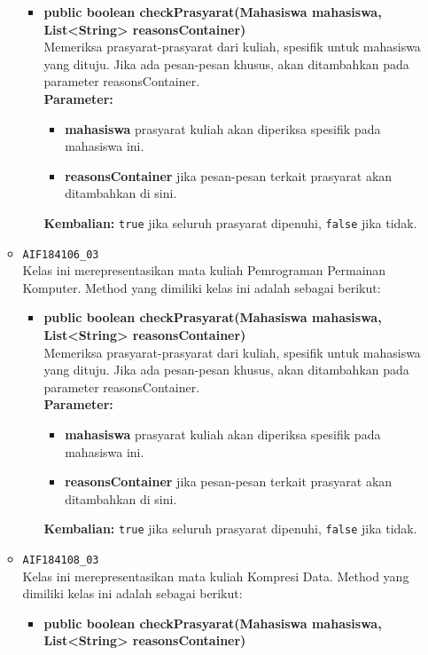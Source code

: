 \begin{enumerate}
\begin{itemize}
		\begin{itemize}
			\item \textbf{public boolean checkPrasyarat(Mahasiswa mahasiswa, List<String> reasonsContainer)}\\
			Memeriksa prasyarat-prasyarat dari kuliah, spesifik untuk mahasiswa yang dituju. Jika ada pesan-pesan khusus, akan ditambahkan pada parameter reasonsContainer.\\
			\textbf{Parameter:}
			\begin{itemize}
				\item \textbf{mahasiswa} prasyarat kuliah akan diperiksa spesifik pada mahasiswa ini.
				\item \textbf{reasonsContainer} jika pesan-pesan terkait prasyarat akan ditambahkan di sini.
			\end{itemize}
			\textbf{Kembalian:} \texttt{true} jika seluruh prasyarat dipenuhi, \texttt{false} jika tidak.
		\end{itemize}
		\item \texttt{AIF184106\_03} \\
		Kelas ini merepresentasikan mata kuliah Pemrograman Permainan Komputer. Method yang dimiliki kelas ini adalah sebagai berikut: 
		\begin{itemize}
			\item \textbf{public boolean checkPrasyarat(Mahasiswa mahasiswa, List<String> reasonsContainer)}\\
			Memeriksa prasyarat-prasyarat dari kuliah, spesifik untuk mahasiswa yang dituju. Jika ada pesan-pesan khusus, akan ditambahkan pada parameter reasonsContainer.\\
			\textbf{Parameter:}
			\begin{itemize}
				\item \textbf{mahasiswa} prasyarat kuliah akan diperiksa spesifik pada mahasiswa ini.
				\item \textbf{reasonsContainer} jika pesan-pesan terkait prasyarat akan ditambahkan di sini.
			\end{itemize}
			\textbf{Kembalian:} \texttt{true} jika seluruh prasyarat dipenuhi, \texttt{false} jika tidak.
		\end{itemize}
		\item \texttt{AIF184108\_03} \\
		Kelas ini merepresentasikan mata kuliah Kompresi Data. Method yang dimiliki kelas ini adalah sebagai berikut: 
		\begin{itemize}
			\item \textbf{public boolean checkPrasyarat(Mahasiswa mahasiswa, List<String> reasonsContainer)}\\

\end{itemize}
\end{itemize}
\end{enumerate}
